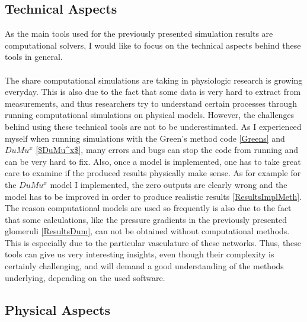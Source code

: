 \subsection{Technical Aspects}

As the main tools used for the previously presented simulation results are computational solvers, I would like to focus on the technical aspects behind these tools in general.\\
\\The share computational simulations are taking in physiologic research is growing everyday. This is also due to the fact that some data is very hard to extract from measurements, and thus researchers try to understand certain processes through running computational simulations on physical models. However, the challenges behind using these technical tools are not to be underestimated. As I experienced myself when running simulations with the Green's method code \ref{Greens} and $DuMu^x$ \ref{$DuMu^x$}, many errors and bugs can stop the code from running and can be very hard to fix. Also, once a model is implemented, one has to take great care to examine if the produced results physically make sense. As for example for the $DuMu^x$ model I implemented, the zero outputs are clearly wrong and the model has to be improved in order to produce realistic results \ref{ResultsImplMeth}.
\\The reason computational models are used so frequently is also due to the fact that some calculations, like the pressure gradients in the previously presented glomeruli \ref{ResultsDum}, can not be obtained without computational methods. This is especially due to the particular vasculature of these networks. Thus, these tools can give us very interesting insights, even though their complexity is certainly challenging, and will demand a good understanding of the methods underlying, depending on the used software.

\newpage
\subsection{Physical Aspects}

